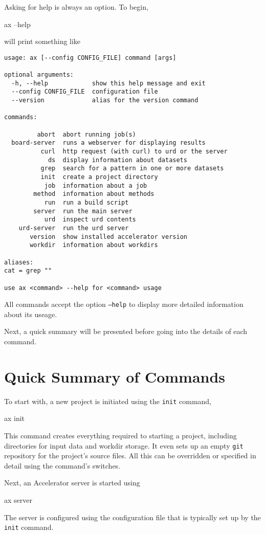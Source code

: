Asking for help is always an option.  To begin,
\begin{shell}
ax --help
\end{shell}
will print something like
\begin{snugshade}
\begin{verbatim}
usage: ax [--config CONFIG_FILE] command [args]

optional arguments:
  -h, --help            show this help message and exit
  --config CONFIG_FILE  configuration file
  --version             alias for the version command

commands:

         abort  abort running job(s)
  board-server  runs a webserver for displaying results
          curl  http request (with curl) to urd or the server
            ds  display information about datasets
          grep  search for a pattern in one or more datasets
          init  create a project directory
           job  information about a job
        method  information about methods
           run  run a build script
        server  run the main server
           urd  inspect urd contents
    urd-server  run the urd server
       version  show installed accelerator version
       workdir  information about workdirs

aliases:
cat = grep ""

use ax <command> --help for <command> usage
\end{verbatim}
\end{snugshade}
\noindent All commands accept the option \texttt{--help} to display
more detailed information about its useage.

Next, a quick summary will be presented before going into
the details of each command.


\section{Quick Summary of Commands}
To start with, a new project is initiated using the \texttt{init}
command,
\begin{shell}
ax init
\end{shell}
This command creates everything required to starting a project,
including directories for input data and workdir storage.  It even
sets up an empty \texttt{git} repository for the project's source
files.  All this can be overridden or specified in detail using the
command's switches.

Next, an Accelerator server is started using
\begin{shell}
ax server
\end{shell}
The server is configured using the configuration file that is
typically set up by the \texttt{init} command.

